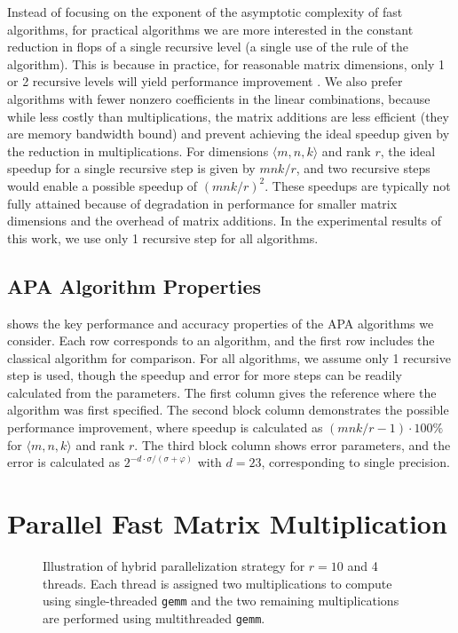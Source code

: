 \documentclass[sigconf,review,anonymous]{acmart}
\newcommand{\dims}[1]{\langle #1 \rangle}
\begin{document}
Instead of focusing on the exponent of the asymptotic complexity of fast algorithms, for practical algorithms we are more interested in the constant reduction in flops of a single recursive level (a single use of the rule of the algorithm).
This is because in practice, for reasonable matrix dimensions, only 1 or 2 recursive levels will yield performance improvement \cite{BB15}.
We also prefer algorithms with fewer nonzero coefficients in the linear combinations, because while less costly than multiplications, the matrix additions are less efficient (they are memory bandwidth bound) and prevent achieving the ideal speedup given by the reduction in multiplications.
For dimensions $\dims{m,n,k}$ and rank $r$, the ideal speedup for a single recursive step is given by $mnk/r$, and two recursive steps would enable a possible speedup of $(mnk/r)^2$.
These speedups are typically not fully attained because of degradation in performance for smaller matrix dimensions and the overhead of matrix additions.
In the experimental results of this work, we use only 1 recursive step for all algorithms.

\subsection{APA Algorithm Properties}
\label{sec:APAprops}

 shows the key performance and accuracy properties of the APA algorithms we consider.
Each row corresponds to an algorithm, and the first row includes the classical algorithm for comparison.
For all algorithms, we assume only 1 recursive step is used, though the speedup and error for more steps can be readily calculated from the parameters.
The first column gives the reference where the algorithm was first specified.
The second block column demonstrates the possible performance improvement, where speedup is calculated as $(mnk/r - 1)\cdot100\%$ for $\dims{m,n,k}$ and rank $r$.
The third block column shows error parameters, and the error is calculated as $2^{-d\cdot\sigma/(\sigma+\varphi)}$ with $d=23$, corresponding to single precision.

\section{Parallel Fast Matrix Multiplication}

\begin{figure}
\centering

\caption{Illustration of hybrid parallelization strategy for $r=10$ and 4 threads.  Each thread is assigned two multiplications to compute using single-threaded \texttt{gemm} and the two remaining multiplications are performed using multithreaded \texttt{gemm}.}
\label{fig:hybrid}
\end{figure}
\end{document}
